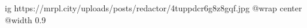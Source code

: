  
 
 
 
 

\ifcmt
  ig https://mrpl.city/uploads/posts/redactor/4tuppdcr6g8z8gqf.jpg
  @wrap center
  @width 0.9
\fi
